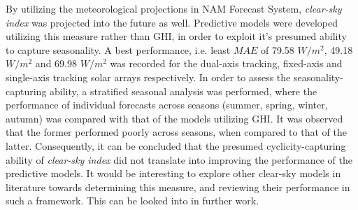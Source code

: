 \par By utilizing the meteorological projections in NAM Forecast System, \textit{clear-sky index} was projected into the future as well. Predictive models were developed utilizing this measure rather than GHI, in order to exploit it's presumed ability to capture seasonality. A best performance, i.e. least $MAE$ of 79.58 $W/m^2$, 49.18 $W/m^2$ and 69.98 $W/m^2$ was recorded for the dual-axis tracking, fixed-axis and single-axis tracking solar arrays respectively. In order to assess the seasonality-capturing ability, a stratified seasonal analysis was performed, where the performance of individual forecasts across seasons (summer, spring, winter, autumn) was compared with that of the models utilizing GHI. It was observed that the former performed poorly across seasons, when compared to that of the latter. Consequently, it can be concluded that the presumed cyclicity-capturing ability of \textit{clear-sky index} did not translate into improving the performance of the predictive models. It would be interesting to explore other clear-sky models in literature towards determining this measure, and reviewing their performance in such a framework. This can be looked into in further work.
